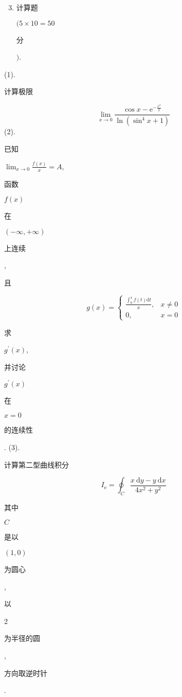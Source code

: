 \documentclass[10pt]{article}
\begin{document}
\begin{enumerate}
  \setcounter{enumi}{2}
  \item \begin{CJK}{UTF8}{mj}计算题\end{CJK} $(5 \times 10=50$ \begin{CJK}{UTF8}{mj}分\end{CJK} $)$.
\end{enumerate}
(1). \begin{CJK}{UTF8}{mj}计算极限\end{CJK}
$$
\lim _{x \rightarrow 0} \frac{\cos x-\mathrm{e}^{-\frac{x^{2}}{2}}}{\ln \left(\sin ^{4} x+1\right)}
$$
(2). \begin{CJK}{UTF8}{mj}已知\end{CJK} $\lim _{x \rightarrow 0} \frac{f(x)}{x}=A$, \begin{CJK}{UTF8}{mj}函数\end{CJK} $f(x)$ \begin{CJK}{UTF8}{mj}在\end{CJK} $(-\infty,+\infty)$ \begin{CJK}{UTF8}{mj}上连续\end{CJK}, \begin{CJK}{UTF8}{mj}且\end{CJK}
$$
g(x)= \begin{cases}\frac{\int_{0}^{x} f(t) \mathrm{d} t}{x}, & x \neq 0 \\ 0, & x=0\end{cases}
$$
\begin{CJK}{UTF8}{mj}求\end{CJK} $g^{\prime}(x)$, \begin{CJK}{UTF8}{mj}并讨论\end{CJK} $g^{\prime}(x)$ \begin{CJK}{UTF8}{mj}在\end{CJK} $x=0$ \begin{CJK}{UTF8}{mj}的连续性\end{CJK}. (3). \begin{CJK}{UTF8}{mj}计算第二型曲线积分\end{CJK}
$$
I_{\mathrm{e}}=\oint_{C} \frac{x \mathrm{~d} y-y \mathrm{~d} x}{4 x^{2}+y^{2}}
$$
\begin{CJK}{UTF8}{mj}其中\end{CJK} $C$ \begin{CJK}{UTF8}{mj}是以\end{CJK} $(1,0)$ \begin{CJK}{UTF8}{mj}为圆心\end{CJK}, \begin{CJK}{UTF8}{mj}以\end{CJK} 2 \begin{CJK}{UTF8}{mj}为半径的圆\end{CJK}, \begin{CJK}{UTF8}{mj}方向取逆时针\end{CJK}.
\end{document}
